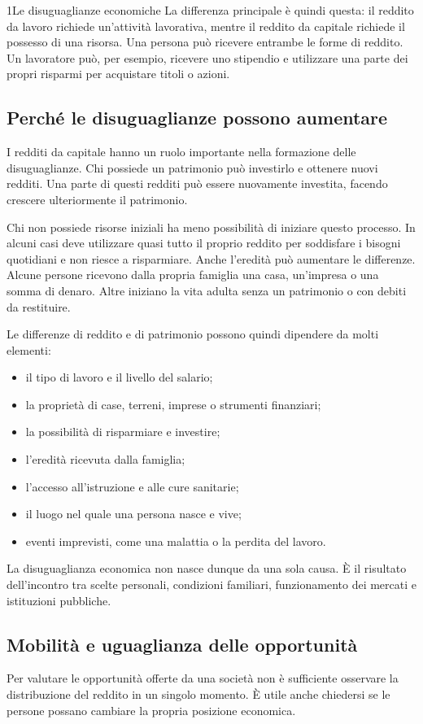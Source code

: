 \begin{lettura}{1}{Le disuguaglianze economiche}
La differenza principale è quindi questa: il reddito da lavoro richiede un'attività lavorativa, mentre il reddito da capitale richiede il possesso di una risorsa. Una persona può ricevere entrambe le forme di reddito. Un lavoratore può, per esempio, ricevere uno stipendio e utilizzare una parte dei propri risparmi per acquistare titoli o azioni.

\subsection*{Perché le disuguaglianze possono aumentare}
I redditi da capitale hanno un ruolo importante nella formazione delle disuguaglianze. Chi possiede un patrimonio può investirlo e ottenere nuovi redditi. Una parte di questi redditi può essere nuovamente investita, facendo crescere ulteriormente il patrimonio.

Chi non possiede risorse iniziali ha meno possibilità di iniziare questo processo. In alcuni casi deve utilizzare quasi tutto il proprio reddito per soddisfare i bisogni quotidiani e non riesce a risparmiare. Anche l'eredità può aumentare le differenze. Alcune persone ricevono dalla propria famiglia una casa, un'impresa o una somma di denaro. Altre iniziano la vita adulta senza un patrimonio o con debiti da restituire.

Le differenze di reddito e di patrimonio possono quindi dipendere da molti elementi:
\begin{itemize}
\item il tipo di lavoro e il livello del salario;
\item la proprietà di case, terreni, imprese o strumenti finanziari;
\item la possibilità di risparmiare e investire;
\item l'eredità ricevuta dalla famiglia;
\item l'accesso all'istruzione e alle cure sanitarie;
\item il luogo nel quale una persona nasce e vive;
\item eventi imprevisti, come una malattia o la perdita del lavoro.
\end{itemize}

La disuguaglianza economica non nasce dunque da una sola causa. È il risultato dell'incontro tra scelte personali, condizioni familiari, funzionamento dei mercati e istituzioni pubbliche.

\subsection*{Mobilità e uguaglianza delle opportunità}
Per valutare le opportunità offerte da una società non è sufficiente osservare la distribuzione del reddito in un singolo momento. È utile anche chiedersi se le persone possano cambiare la propria posizione economica.


\end{lettura}
